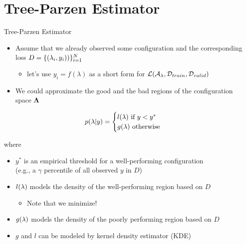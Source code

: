 \section{Tree-Parzen Estimator}
\begin{frame}[c,fragile]{Tree-Parzen Estimator }

\begin{itemize}
	\item Assume that we already observed some configuration and the corresponding loss $D = \{(\mathbf{\lambda}_i, y_i))\}_{i=1}^N$
	\begin{itemize}
		\item let's use $y_i = f(\lambda)$ as a short form for $\mathcal{L}(\mathcal{A}_{\mathbf{\lambda}}, \mathcal{D}_{train}, \mathcal{D}_{valid})$
	\end{itemize}
	\pause
	\item We could approximate the good and the bad regions of the configuration space $\mathbf{\Lambda}$
\end{itemize}

$$
p(\mathbf{\lambda}|y) = \begin{cases}
l(\mathbf{\lambda}) \text{ if } y < y^*\\
g(\mathbf{\lambda}) \text{ otherwise} 
\end{cases}
$$

where 
\begin{itemize}
	\item $y^*$ is an empirical threshold for a well-performing configuration\\ (e.g., a $\gamma$ percentile of all observed $y$ in $D$)
	\pause
	\item $l(\mathbf{\lambda})$ models the density of the well-performing region based on $D$
	\begin{itemize}
		\item Note that we minimize!
	\end{itemize}
	\pause
	\item $g(\mathbf{\lambda})$ models the density of the poorly performing region based on $D$
	\pause
	\item $g$ and $l$ can be modeled by kernel density estimator (KDE)
\end{itemize}

\end{frame}
